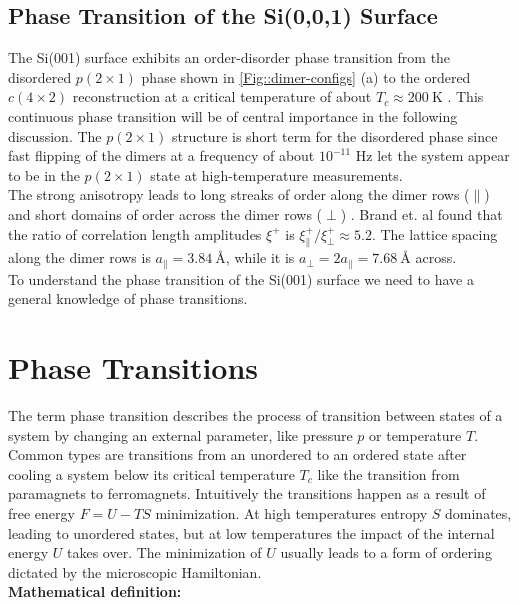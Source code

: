 	\section{Phase Transition of the Si(0,0,1) Surface}
	The Si(001) surface exhibits an order-disorder phase transition from the disordered $p(2\times1)$ phase shown in \autoref{Fig::dimer-configs} (a) to the ordered $c(4\times2)$ reconstruction at a critical temperature of about $T_c \approx 200~\text{K}$ \cite{tabata1987order}. This continuous phase transition will be of central importance in the following discussion. The $p(2\times1)$ structure is short term for the disordered phase since fast flipping of the dimers at a frequency of about $ 10^{-11} \text{ Hz}$ let the system appear to be in the $p(2\times1)$ state at high-temperature measurements. \\
	
	The strong anisotropy leads to long streaks of order along the dimer rows ($\parallel$) and short domains of order across the dimer rows ($\perp$) . Brand et. al \cite{brand2023dimer} found that the ratio of correlation length amplitudes $\xi^+$ is ${\xi_{\parallel}^+}/{\xi_{\perp}^+} \approx 5.2$. The lattice spacing along the dimer rows is $a_\parallel =	3.84~\text{\AA}$, while it is $a_\perp =	2 a_\parallel =	7.68~\text{\AA}$ across. \\
	
	To understand the phase transition of the Si(001) surface we need to have a general knowledge of phase transitions.
	\chapter{Phase Transitions} \label{Chapter::Phase-Transitions}
	
	The term phase transition describes the process of transition between states of a system by changing an external parameter, like pressure $p$ or temperature $T$. Common types are transitions from an unordered to an ordered state after cooling a system below its critical temperature $T_c$ like the transition from paramagnets to ferromagnets. Intuitively the transitions happen as a result of free energy $F =	U - TS$ minimization. At high temperatures entropy $S$ dominates, leading to unordered states, but at low temperatures the impact of the internal energy $U$ takes over. The minimization of $U$ usually leads to a form of ordering dictated by the microscopic Hamiltonian. \\
	
	\textbf{Mathematical definition:}
	
